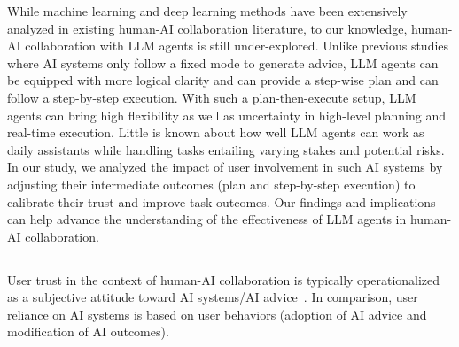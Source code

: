 While machine learning and deep learning methods have been extensively analyzed in existing human-AI collaboration literature, to our knowledge, human-AI collaboration with LLM agents is still under-explored. 
Unlike previous studies where AI systems only follow a fixed mode to generate advice, LLM agents can be equipped with more logical clarity and can provide a step-wise plan and can follow a step-by-step execution. 
With such a plan-then-execute setup, LLM agents can bring high flexibility as well as uncertainty in high-level planning and real-time execution. Little is known about
how well LLM agents can work as daily assistants while handling tasks entailing varying stakes and potential risks. %
In our study, we analyzed the impact of user involvement in such AI systems by adjusting their intermediate outcomes (plan and step-by-step execution) to calibrate their trust and improve task outcomes. 
Our findings and implications can help advance the understanding of the effectiveness of LLM agents in human-AI collaboration.


\subsection{}
\label{sec-rel-trust-reliance}
User trust in the context of human-AI collaboration is typically operationalized as a subjective attitude toward AI systems/AI advice~\cite{lee2004trust}. 
In comparison, user reliance on AI systems is based on user behaviors (\eg adoption of AI advice and modification of AI outcomes). 

